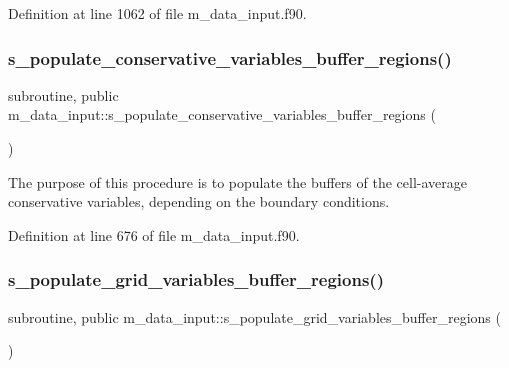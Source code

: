 Definition at line 1062 of file m\+\_\+data\+\_\+input.\+f90.

\mbox{\label{namespacem__data__input_a5cef0da967dbbf0d148b26bd67046c8d}} 
\subsubsection{\texorpdfstring{s\+\_\+populate\+\_\+conservative\+\_\+variables\+\_\+buffer\+\_\+regions()}{s\_populate\_conservative\_variables\_buffer\_regions()}}
{\footnotesize\ttfamily subroutine, public m\+\_\+data\+\_\+input\+::s\+\_\+populate\+\_\+conservative\+\_\+variables\+\_\+buffer\+\_\+regions (\begin{DoxyParamCaption}{ }\end{DoxyParamCaption})}



The purpose of this procedure is to populate the buffers of the cell-\/average conservative variables, depending on the boundary conditions. 



Definition at line 676 of file m\+\_\+data\+\_\+input.\+f90.

\mbox{\label{namespacem__data__input_afc05d7714001946feb2485ce18cb00f6}} 
\subsubsection{\texorpdfstring{s\+\_\+populate\+\_\+grid\+\_\+variables\+\_\+buffer\+\_\+regions()}{s\_populate\_grid\_variables\_buffer\_regions()}}
{\footnotesize\ttfamily subroutine, public m\+\_\+data\+\_\+input\+::s\+\_\+populate\+\_\+grid\+\_\+variables\+\_\+buffer\+\_\+regions (\begin{DoxyParamCaption}{ }\end{DoxyParamCaption})}



